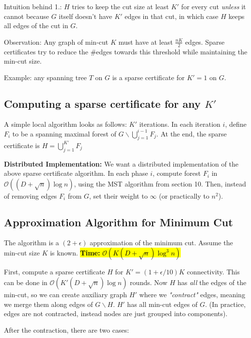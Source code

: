 \documentclass[a4paper, 8pt, landscape]{scrartcl}
\begin{document}
\begin{multicols*}{3}
Intuition behind 1.: $H$ tries to keep the cut size at least $K'$ for every cut \textit{unless} it cannot because $G$ itself doesn't have $K'$ edges in that cut, in which case $H$ keeps all edges of the cut in $G$.

Observation: Any graph of min-cut $K$ must have at least $\frac{nK}{2}$ edges. Sparse certificates try to reduce the \#edges towards this threshold while maintaining the min-cut size.

Example: any spanning tree $T$ on $G$ is a sparse certificate for $K' = 1$ on $G$.

\subsection{Computing a sparse certificate for any $K'$}

A simple local algorithm looks as follows: $K'$ iterations. In each iteration $i$, define $F_i$ to be a spanning maximal forest of $G \backslash \bigcup_{j=1}^{i-1} F_j$. At the end, the sparse certificate is $H = \bigcup_{j=1}^{K'} F_j$


\textbf{Distributed Implementation:} We want a distributed implementation of the above sparse certificate algorithm. In each phase $i$, compute forest $F_i$ in $\mathcal{O}((D+\sqrt{n})\log n)$, using the MST algorithm from section 10. Then, instead of removing edges $F_i$ from $G$, set their weight to $\infty$ (or practically to $n^2$).


\subsection{Approximation Algorithm for Minimum Cut}

The algorithm is a $(2+\epsilon)$ approximation of the minimum cut. Assume the min-cut size $K$ is known. \hl{\textbf{Time:} $\mathcal{O}(K(D+\sqrt{n})\log^3 n)$}

First, compute a sparse certificate $H$ for $K' = (1 + \epsilon/10)K$ connectivity. This can be done in $\mathcal{O}(K'(D+\sqrt{n})\log n)$ rounds. Now $H$ has \textit{all} the edges of the min-cut, so we can create auxiliary graph $H'$ where we \textit{"contract"} edges, meaning we merge them along edges of $G \backslash H$. $H'$ has all min-cut edges of $G$.
(In practice, edges are not contracted, instead nodes are just grouped into components).

After the contraction, there are two cases:


\end{multicols*}
\end{document}
